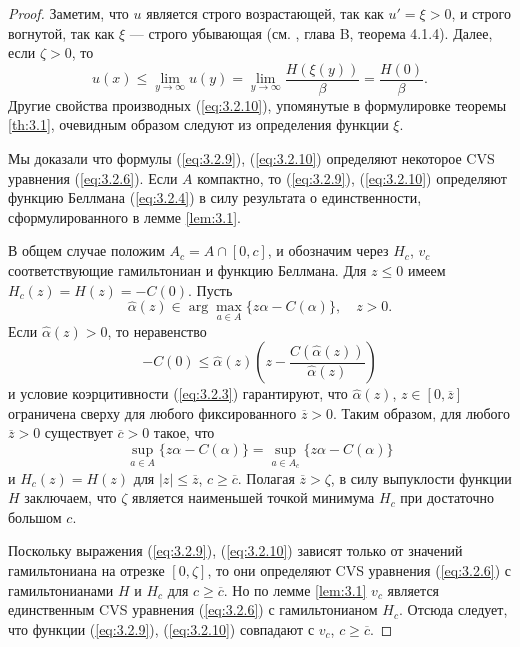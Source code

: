 \begin{proof}
Заметим, что $u$ является строго возрастающей, так как $u'=\xi>0$, и строго вогнутой, так как $\xi$ --- строго убывающая (см. \cite{HirUrrLem01}, глава B, теорема 4.1.4). Далее, если $\zeta>0$, то
$$ u(x)\le\lim_{y\to\infty} u(y)=\lim_{y\to\infty}\frac{H(\xi(y))}{\beta}=\frac{H(0)}{\beta}.$$
Другие свойства производных (\ref{eq:3.2.10}), упомянутые в формулировке теоремы \ref{th:3.1}, очевидным образом следуют из определения функции $\xi$.

Мы доказали что  формулы (\ref{eq:3.2.9}), (\ref{eq:3.2.10}) определяют некоторое CVS уравнения (\ref{eq:3.2.6}). Если $A$ компактно, то (\ref{eq:3.2.9}), (\ref{eq:3.2.10}) определяют функцию Беллмана (\ref{eq:3.2.4}) в силу результата о единственности, сформулированного в лемме \ref{lem:3.1}.

В общем случае положим $A_c=A\cap [0, c]$, и обозначим через $H_c$, $v_c$ соответствующие гамильтониан и функцию Беллмана.
Для $z\le 0$ имеем $H_c(z)=H(z)=-C(0)$. Пусть
$$ \widehat\alpha(z)\in\arg\max_{a\in A}\{z\alpha-C(\alpha)\},\quad z>0. $$
Если $\widehat\alpha(z)>0$, то неравенство
$$-C(0)\le \widehat\alpha(z) \left(z -\frac{C(\widehat\alpha(z))}{\widehat\alpha(z)}\right)$$
и условие коэрцитивности (\ref{eq:3.2.3}) гарантируют, что $\widehat\alpha(z)$, $z\in [0,\overline z]$ ограничена сверху для любого фиксированного $\overline z>0$.
Таким образом, для любого $\overline z>0$ существует $\overline c>0$ такое, что
$$ \sup_{a\in A}\{z\alpha-C(\alpha)\}=\sup_{a\in A_c}\{z\alpha-C(\alpha)\}$$
и $H_c(z)=H(z)$ для $|z|\le \overline z$, $c\ge\overline c$. Полагая $\overline z>\zeta$, в силу выпуклости функции $H$ заключаем, что $\zeta$ является наименьшей точкой минимума $H_c$ при достаточно большом $c$.

Поскольку выражения (\ref{eq:3.2.9}), (\ref{eq:3.2.10}) зависят только от значений гамильтониана на отрезке $[0,\zeta]$, то они определяют CVS уравнения (\ref{eq:3.2.6}) с гамильтонианами $H$ и $H_c$ для $c\ge\overline c$. Но по лемме \ref{lem:3.1} $v_c$ является единственным CVS уравнения (\ref{eq:3.2.6}) с гамильтонианом $H_c$. Отсюда следует, что функции (\ref{eq:3.2.9}), (\ref{eq:3.2.10}) совпадают с $v_c$, $c\ge\overline c$.


\end{proof}

